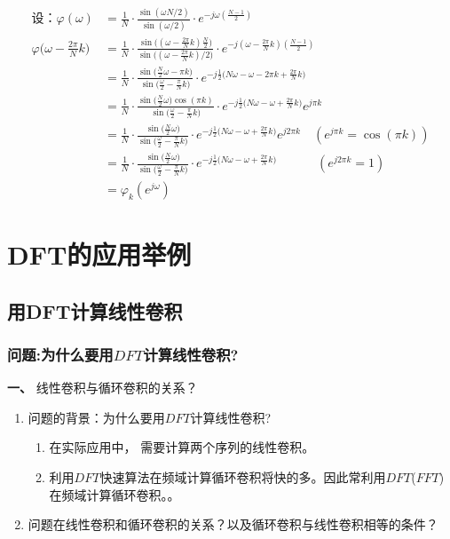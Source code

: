 \documentclass[notheorems,compress,mathserif,table]{beamer}
\begin{document}
\begin{frame}[shrink]\frametitle{}%
\begin{equation*}
\begin{split}
\mbox{设：}  \varphi(\omega)
      &= \frac{1}{N}\cdot\frac{\sin(\omega N/2)}{\sin(\omega/2)}\cdot e^{-j\omega(\frac{N-1}{2}) }\\
\varphi\Big(\omega-\frac{2\pi}{N}k\Big)
      &= \frac{1}{N}\cdot\frac{\sin\Big((\omega-\frac{2\pi}{N}k) \frac{N}{2}\Big)}{\sin\Big((\omega-\frac{2\pi}{N}k)/2\Big)}\cdot e^{-j(\omega-\frac{2\pi}{N}k)(\frac{N-1}{2}) }\\
      &= \frac{1}{N}\cdot\frac{\sin\Big(\frac{N}{2}\omega-\pi k \Big)}{\sin\Big(\frac{\omega}{2} -\frac{\pi}{N}k\Big)}\cdot e^{-j\frac{1}{2}\big(N\omega-\omega -2\pi k + \frac{2\pi}{N}k\big) }\\
      &= \frac{1}{N}\cdot\frac{\sin\big(\frac{N}{2}\omega\big) \cos(\pi k)}{\sin\Big(\frac{\omega}{2} -\frac{\pi}{N}k\Big)}\cdot e^{-j\frac{1}{2}\big(N\omega-\omega + \frac{2\pi}{N}k\big) } e^{j\pi k}\\
      &= \frac{1}{N}\cdot\frac{\sin\big(\frac{N}{2}\omega\big)}{\sin\Big(\frac{\omega}{2} -\frac{\pi}{N}k\Big)}\cdot e^{-j\frac{1}{2}\big(N\omega-\omega + \frac{2\pi}{N}k\big) } e^{j2\pi k} \quad(e^{j\pi k} =\cos(\pi k))\\
      &= \frac{1}{N}\cdot\frac{\sin\big(\frac{N}{2}\omega\big)}{\sin\Big(\frac{\omega}{2} -\frac{\pi}{N}k\Big)}\cdot e^{-j\frac{1}{2}\big(N\omega-\omega + \frac{2\pi}{N}k\big) } \qquad\:\quad(e^{j2\pi k} =1)\\
      &= \varphi_k(e^{j\omega})
\end{split}
\end{equation*}
\end{frame}
%
%
%
%
\section{DFT的应用举例}
%
%
\subsection{用DFT计算线性卷积}
\begin{frame}[shrink]\frametitle{问题:为什么要用$DFT$计算线性卷积?}%
\textbf{一、} 线性卷积与循环卷积的关系？

\begin{enumerate}
  \item  问题的背景：为什么要用$DFT$计算线性卷积?
     \begin{enumerate}
       \item 在实际应用中，%
             需要计算两个序列的线性卷积。
       \item %
             利用$DFT$快速算法在频域计算循环卷积将快的多。因此常利用$DFT$($FFT$)在频域计算循环卷积。。
     \end{enumerate}
  \item 问题在线性卷积和循环卷积的关系？以及循环卷积与线性卷积相等的条件？
\end{enumerate}
\end{frame}
\end{document}
